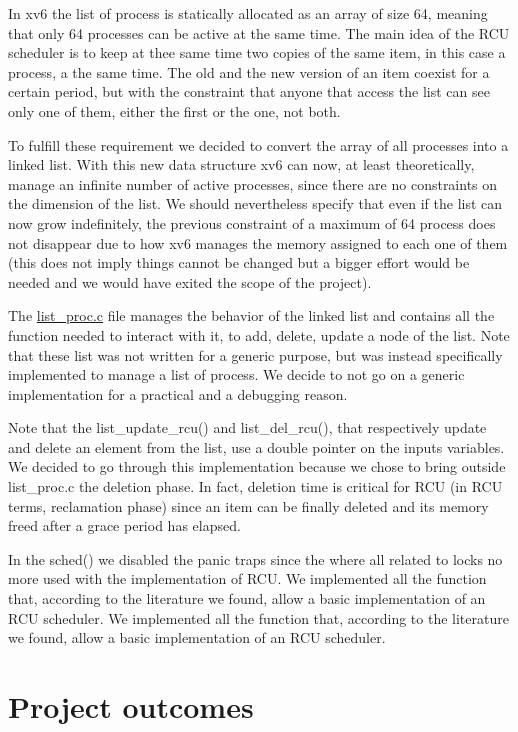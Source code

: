 \documentclass[10pt,a4]{article}
\begin{document}
In xv6 the list of process is statically allocated as an array of size 64, meaning that only 64 processes can be active at the same time. The main idea of the RCU scheduler is to keep at thee same time two copies of the same item, in this case a process, a the same time. The old and the new version of an item coexist for a certain period, but with the constraint that anyone that access the list can see only one of them, either the first or the one, not both. 

To fulfill these requirement we decided to convert the array of all processes into a linked list. With this new data structure xv6 can now, at least theoretically, manage an infinite number of active processes, since there are no constraints on the dimension of the list. We should nevertheless specify that even if the list can now grow indefinitely, the previous constraint of a maximum of 64 process does not disappear due to how xv6 manages the memory  assigned to each one of them (this does not imply things cannot be changed but a bigger effort would be needed and we would have exited the scope of the project).

The \href{https://github.com/salvoM/xv6-riscv-rcu/blob/definitive/kernel/list_proc.c}{list\_proc.c} file manages the behavior of the linked list and contains all the function needed to interact with it, to add, delete, update a node of the list. Note that these list was not written for a  generic purpose, but was instead specifically implemented to manage a list of process. We decide to not go on a generic implementation for a practical and a debugging reason.

Note that the list\_update\_rcu() and list\_del\_rcu(), that respectively update and delete an element from the list, 
use a double pointer on the inputs variables. 
We decided to go through this implementation because we chose to bring outside list\_proc.c the deletion phase. 
In fact, deletion time is critical for RCU (in RCU terms, reclamation phase) since an item can be finally deleted and its memory freed after a grace period has elapsed. 

In the sched() we disabled the panic traps since the where all related to locks no more used with the implementation of RCU. 
We implemented all the function that, according to the literature we found, allow a basic implementation of an RCU scheduler. We implemented all the function that, according to the literature we found, allow a basic implementation of an RCU scheduler.


\section{Project outcomes}
\end{document}

